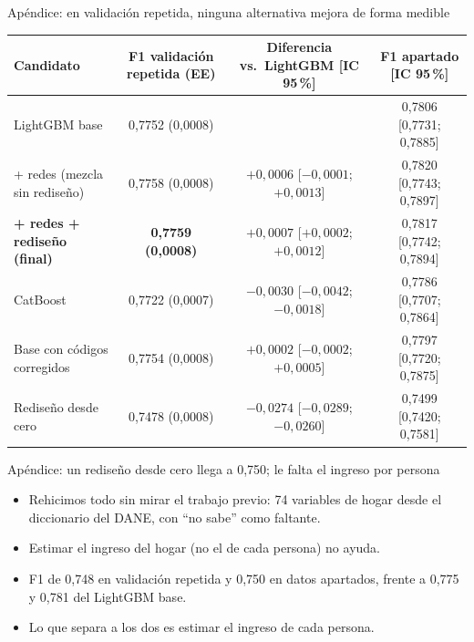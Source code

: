 \documentclass[aspectratio=169,11pt]{beamer}
\begin{document}
\begin{frame}{Apéndice: en validación repetida, ninguna alternativa mejora de forma medible}
  \centering\scriptsize\setlength{\tabcolsep}{4pt}
  \begin{tabular}{@{}lccc@{}}
    \toprule
    Candidato & F1 validación repetida (EE) & Diferencia vs.\ LightGBM [IC 95\,\%] & F1 apartado [IC 95\,\%] \\
    \midrule
    LightGBM base & 0,7752 (0,0008) & & 0,7806 [0,7731; 0,7885] \\
    + redes (mezcla sin rediseño) & 0,7758 (0,0008) & $+0{,}0006$ [$-0{,}0001$; $+0{,}0013$] & 0,7820 [0,7743; 0,7897] \\
    \textbf{+ redes + rediseño (final)} & \textbf{0,7759 (0,0008)} & $+0{,}0007$ [$+0{,}0002$; $+0{,}0012$] & 0,7817 [0,7742; 0,7894] \\
    CatBoost & 0,7722 (0,0007) & $-0{,}0030$ [$-0{,}0042$; $-0{,}0018$] & 0,7786 [0,7707; 0,7864] \\
    Base con códigos corregidos & 0,7754 (0,0008) & $+0{,}0002$ [$-0{,}0002$; $+0{,}0005$] & 0,7797 [0,7720; 0,7875] \\
    Rediseño desde cero & 0,7478 (0,0008) & $-0{,}0274$ [$-0{,}0289$; $-0{,}0260$] & 0,7499 [0,7420; 0,7581] \\
    \bottomrule
  \end{tabular}
\end{frame}

\begin{frame}{Apéndice: un rediseño desde cero llega a 0,750; le falta el ingreso por persona}
  \small
  \begin{itemize}
    \item Rehicimos todo sin mirar el trabajo previo: 74 variables de hogar desde el
      diccionario del DANE, con ``no sabe'' como faltante.
    \item Estimar el ingreso del hogar (no el de cada persona) no ayuda.
    \item F1 de 0,748 en validación repetida y 0,750 en datos apartados, frente a 0,775 y
      0,781 del LightGBM base.
    \item Lo que separa a los dos es estimar el ingreso de cada persona.
  \end{itemize}
\end{frame}
\end{document}
